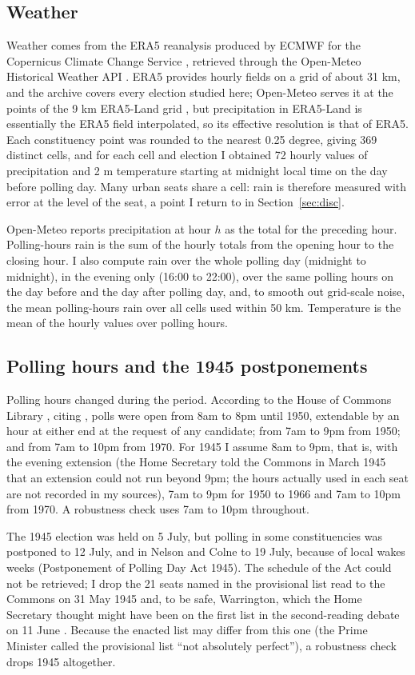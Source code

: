 \documentclass[11pt,a4paper]{article}
\begin{document}
\subsection{Weather}
Weather comes from the ERA5 reanalysis produced by ECMWF for the Copernicus Climate Change Service \citep{hersbach2020}, retrieved through the Open-Meteo Historical Weather API \citep{zippenfenig2023}. ERA5 provides hourly fields on a grid of about 31 km, and the archive covers every election studied here; Open-Meteo serves it at the points of the 9 km ERA5-Land grid \citep{munozsabater2021}, but precipitation in ERA5-Land is essentially the ERA5 field interpolated, so its effective resolution is that of ERA5. Each constituency point was rounded to the nearest 0.25 degree, giving 369 distinct cells, and for each cell and election I obtained 72 hourly values of precipitation and 2 m temperature starting at midnight local time on the day before polling day. Many urban seats share a cell: rain is therefore measured with error at the level of the seat, a point I return to in Section~\ref{sec:disc}.

Open-Meteo reports precipitation at hour $h$ as the total for the preceding hour. Polling-hours rain is the sum of the hourly totals from the opening hour to the closing hour. I also compute rain over the whole polling day (midnight to midnight), in the evening only (16:00 to 22:00), over the same polling hours on the day before and the day after polling day, and, to smooth out grid-scale noise, the mean polling-hours rain over all cells used within 50 km. Temperature is the mean of the hourly values over polling hours.

\subsection{Polling hours and the 1945 postponements}
Polling hours changed during the period. According to the House of Commons Library \citep{white2012}, citing \citet{ralling2007}, polls were open from 8am to 8pm until 1950, extendable by an hour at either end at the request of any candidate; from 7am to 9pm from 1950; and from 7am to 10pm from 1970. For 1945 I assume 8am to 9pm, that is, with the evening extension (the Home Secretary told the Commons in March 1945 that an extension could not run beyond 9pm; the hours actually used in each seat are not recorded in my sources), 7am to 9pm for 1950 to 1966 and 7am to 10pm from 1970. A robustness check uses 7am to 10pm throughout.

The 1945 election was held on 5 July, but polling in some constituencies was postponed to 12 July, and in Nelson and Colne to 19 July, because of local wakes weeks (Postponement of Polling Day Act 1945). The schedule of the Act could not be retrieved; I drop the 21 seats named in the provisional list read to the Commons on 31 May 1945 and, to be safe, Warrington, which the Home Secretary thought might have been on the first list in the second-reading debate on 11 June \citep{hansard1945a,hansard1945b}. Because the enacted list may differ from this one (the Prime Minister called the provisional list ``not absolutely perfect''), a robustness check drops 1945 altogether.
\end{document}
